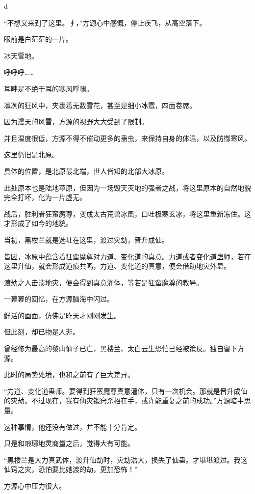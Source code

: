 
\begin{this_body}

d

“不想又来到了这里。∮，”方源心中感慨，停止疾飞，从高空落下。

眼前是白茫茫的一片。

冰天雪地。

呼呼呼……

耳畔是不绝于耳的寒风呼啸。

凛冽的狂风中，夹裹着无数雪花，甚至是细小冰雹，四面卷席。

因为漫天的风雪，方源的视野大大受到了限制。

并且温度很低，方源不得不催动更多的蛊虫，来保持自身的体温，以及防御寒风。

这里仍旧是北原。

具体的位置，是北原最北端，世人皆知的北部大冰原。

此处原本也是陆地草原，但因为一场毁天灭地的强者之战，将这里原本的自然地貌完全打坏，化为一片虚无。

战后，胜利者狂蛮魔尊，变成太古荒兽冰凰，口吐极寒玄冰，将这里重新冻住。这才形成了如今的地貌。

当初，黑楼兰就是选址在这里，渡过灾劫，晋升成仙。

皆因，冰原中蕴含着狂蛮魔尊对力道、变化道的真意。力道或者变化道蛊师，若在这里升仙，就会形成道痕共鸣，力道、变化道的真意，便会借助地灾外显。

渡劫之人击溃地灾，便会得到真意灌体，等若是狂蛮魔尊的教导。

一幕幕的回忆，在方源脑海中闪过。

鲜活的画面，仿佛是昨天才刚刚发生。

但此刻，却已物是人非。

曾经修为最高的黎山仙子已亡，黑楼兰、太白云生恐怕已经被策反。独自留下方源。

此时的局势处境，也和之前有了巨大差异。

“力道、变化道蛊师。要得到狂蛮魔尊真意灌体，只有一次机会。那就是晋升成仙的灾劫。不过现在，我有仙灾锻窍杀招在手，或许能重复之前的成功。”方源暗中思量。

这种事情，他还没有做过，并不能十分肯定。

只是和琅琊地灵商量之后，觉得大有可能。

“黑楼兰是大力真武体，渡升仙劫时，灾劫浩大，损失了仙蛊。才堪堪渡过。我这仙窍之灾，恐怕要比她渡的劫，更加恐怖！”

方源心中压力很大。


\end{this_body}
